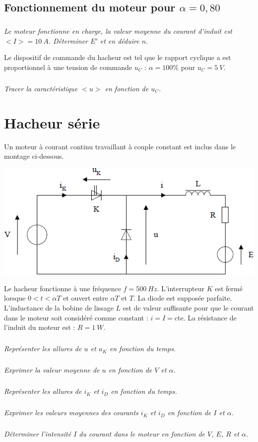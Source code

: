 \documentclass[10pt,fleqn]{article} %
\begin{document}
\begin{multicols}{2}
\begin{multicols}{2}
\subsection*{Fonctionnement du moteur pour $\alpha = 0,80$}
\subparagraph{}\textit{Le moteur fonctionne en charge, la valeur moyenne du courant d'induit est $< I > = \SI{10}{A}$.
Déterminer $E'$ et en déduire $n$.}
\ifprof
\begin{corrige}
\end{corrige}
\else
\fi


Le dispositif de commande du hacheur est tel que le rapport cyclique a est proportionnel à
une tension de commande $u_C$ : $\alpha = 100\%$ pour $u_C =\SI{5}{V}$.

\subparagraph{}\textit{Tracer la caractéristique $< u >$ en fonction de $u_C$.}



\newpage

\section*{Hacheur série}

\setcounter{exo}{0}
Un moteur à courant continu travaillant à couple constant est inclus dans le montage ci-dessous.


\begin{center}
\includegraphics[width=\linewidth]{images/fig_04}
\end{center}


Le hacheur fonctionne à une fréquence $f = \SI{500}{Hz}$.
L’interrupteur $K$ est fermé lorsque $0 < t < \alpha T$ et ouvert entre $\alpha T$ et $T$.
La diode est supposée parfaite.
L'inductance de la bobine de lissage $L$ est de valeur suffisante pour que le courant dans le
moteur soit considéré comme constant : $i= I = \text{cte}$.
La résistance de l’induit du moteur est : $R = \SI{1}{W}$.

\subparagraph{}\textit{ Représenter les allures de $u$ et $u_K$ en fonction du temps.}
\subparagraph{}\textit{ Exprimer la valeur moyenne de $u$ en fonction de $V$ et $\alpha$.}
\subparagraph{}\textit{ Représenter les allures de $i_K$ et $i_D$ en fonction du temps.}
\subparagraph{}\textit{ Exprimer les valeurs moyennes des courants $i_K$ et $i_D$ en fonction de $I$ et $\alpha$.}
\subparagraph{}\textit{ Déterminer l'intensité $I$ du courant dans le moteur en fonction de $V$, $E$, $R$ et $\alpha$.}


\end{multicols}
\end{multicols}
\end{document}
